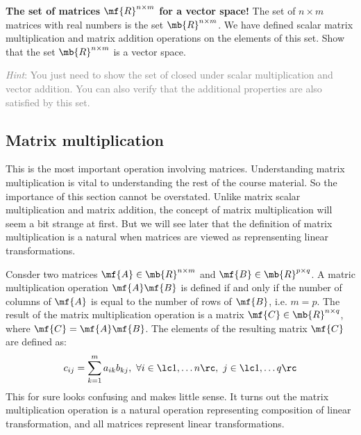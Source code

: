 \begin{boxedstuff}
    \begin{problem}
        \textbf{The set of matrices $\mf{R}^{n\times m}$ for a vector space!} The set of $n \times m$ matrices with real numbers is the set $\mb{R}^{n \times m}$. We have defined scalar matrix multiplication and matrix addition operations on the elements of this set. Show that the set $\mb{R}^{n \times m}$ is a vector space. 
        
        \noindent\begin{small}\textcolor{gray}{\textit{Hint}: You just need to show the set of closed under scalar multiplication and vector addition. You can also verify that the additional properties are also satisfied by this set.}\end{small}
    \end{problem}
\end{boxedstuff}

\subsection{Matrix multiplication}
This is the most important operation involving matrices. Understanding matrix multiplication is vital to understanding the rest of the course material. So the importance of this section cannot be overstated. Unlike matrix scalar multiplication and matrix addition, the concept of matrix multiplication will seem a bit strange at first. But we will see later that the definition of matrix multiplication is a natural when matrices are viewed as reprensenting linear transformations. 

Consder two matrices $\mf{A} \in \mb{R}^{n \times m}$ and $\mf{B} \in \mb{R}^{p \times q}$. A matric multiplication operation $\mf{A}\mf{B}$ is defined if and only if the number of columns of $\mf{A}$ is equal to the number of rows of $\mf{B}$, i.e. $m = p$. The result of the matrix multiplication operation is a matrix $\mf{C} \in \mb{R}^{n \times q}$, where $\mf{C} = \mf{A}\mf{B}$. The elements of the resulting matrix $\mf{C}$ are defined as:
\begin{equation}
    c_{ij} = \sum_{k=1}^{m} a_{ik}b_{kj}, \,\, \forall i \in \lc 1, \ldots n\rc, \,\, j \in \lc 1, \ldots q\rc
    \label{eq:ch02-mat-mult}
\end{equation}
This for sure looks confusing and makes little sense. It turns out the matrix multiplication operation is a natural operation representing composition of linear transformation, and all matrices represent linear transformations. 

